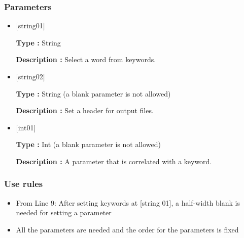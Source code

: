 \subsubsection{Parameters}
\begin{itemize}
   \item  $[$string01$]$
   
   {\bf Type :} String

  {\bf Description :} Select a word from keywords.
   
   \item  $[$string02$]$
   
   {\bf Type :} String (a blank parameter is not allowed)

  {\bf Description :} Set a header for output files.

   \item  $[$int01$]$
   
   {\bf Type :} Int (a blank parameter is not allowed)

  {\bf Description :} A parameter that is correlated with a keyword.
  \end{itemize}

\subsubsection{Use rules}
\begin{itemize}
\item From Line 9: After setting keywords at [string 01], a half-width blank is needed for setting a parameter
\item All the parameters are needed and the order for the parameters is fixed
\end{itemize}


